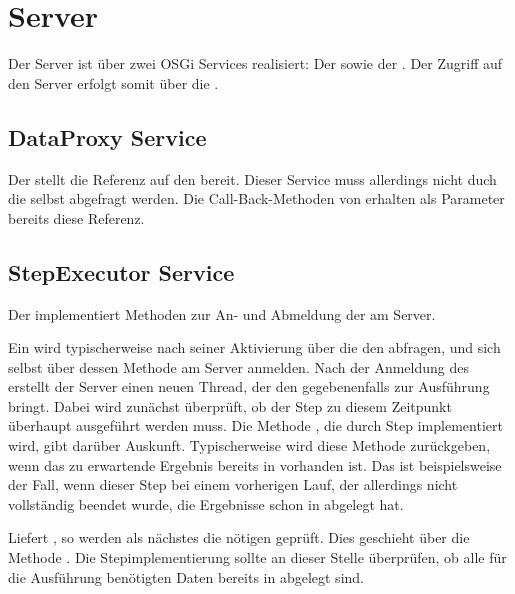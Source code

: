 \section{Server}
Der Server ist über zwei OSGi Services 
realisiert:
Der  sowie der .
Der Zugriff auf den Server erfolgt somit über die .

\subsection{DataProxy Service}
Der  stellt die Referenz auf den 
bereit.
Dieser Service muss allerdings nicht duch die  selbst abgefragt
werden. Die Call-Back-Methoden von  erhalten als Parameter bereits
diese Referenz.

\subsection{StepExecutor Service}
Der  implementiert Methoden zur An- und Abmeldung
der  am Server.



Ein  wird typischerweise nach seiner Aktivierung
über die  den  abfragen, und
sich selbst über dessen  Methode am Server anmelden.
Nach der Anmeldung des  erstellt der Server einen neuen Thread, der
den  gegebenenfalls zur Ausführung bringt.
Dabei wird zunächst überprüft, ob der Step zu diesem Zeitpunkt überhaupt
ausgeführt werden muss.
Die Methode , die durch Step implementiert wird, gibt
darüber Auskunft. 
Typischerweise wird diese Methode  zurückgeben, wenn das zu
erwartende Ergebnis bereits in  vorhanden ist.
Das ist beispielsweise der Fall, wenn dieser Step bei einem vorherigen Lauf,
der allerdings nicht vollständig beendet wurde, die Ergebnisse schon in
 abgelegt hat.

Liefert  , so werden als nächstes die nötigen
  geprüft.
Dies geschieht über die Methode .
Die Stepimplementierung sollte an dieser Stelle überprüfen, ob alle für die
Ausführung benötigten Daten bereits in  abgelegt sind.


